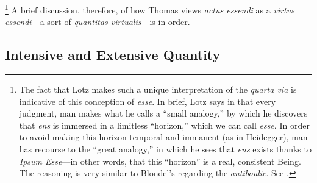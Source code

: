 %
\footnote{The fact that Lotz makes such a unique interpretation of the \emph{quarta via} is indicative of this conception of \emph{esse}. In brief, Lotz says in that every judgment, man makes what he calls a “small analogy,” by which he discovers that \emph{ens} is immersed in a limitless “horizon,” which we can call \emph{esse}. In order to avoid making this horizon temporal and immanent (as in Heidegger), man has recourse to the “great analogy,” in which he sees that \emph{ens} exists thanks to \emph{Ipsum Esse}—in other words, that this “horizon” is a real, consistent Being. The reasoning is very similar to Blondel’s regarding the \emph{antiboulie}. See \cite[228–229]{contat:confronto}.}
%
A brief discussion, therefore, of how Thomas views \emph{actus essendi} as a \emph{virtus essendi}—a sort of \emph{quantitas virtualis}—is in order.

\subsection{Intensive and Extensive Quantity}
\label{sec:intensive-extensive}

